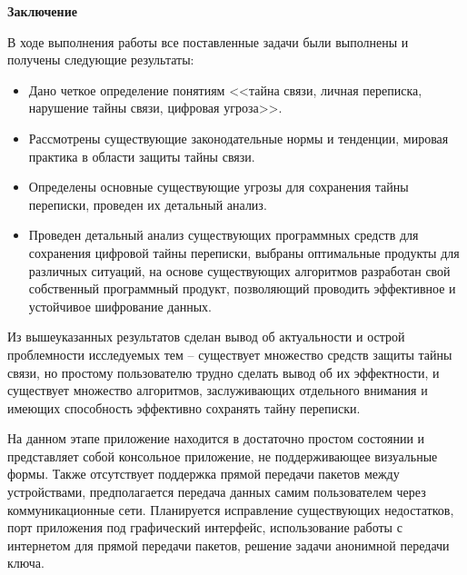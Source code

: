 \parindent=1cm %
\begin{center}
	
	\textbf{Заключение}
	
\end{center}

В ходе выполнения работы все поставленные задачи были выполнены и получены следующие результаты: 
\begin{itemize}
	\item  Дано четкое определение понятиям <<тайна связи, личная переписка, нарушение тайны связи, цифровая угроза>>.
	\item Рассмотрены существующие законодательные нормы и тенденции, мировая практика в области защиты тайны связи.
	\item Определены основные существующие угрозы для сохранения тайны переписки, проведен их детальный анализ.
	\item Проведен детальный анализ существующих программных средств для сохранения цифровой тайны переписки, выбраны оптимальные продукты для различных ситуаций, на основе существующих алгоритмов разработан свой собственный программный продукт, позволяющий проводить эффективное и устойчивое шифрование данных. 
\end{itemize}

Из  вышеуказанных результатов  сделан вывод об актуальности и острой проблемности исследуемых тем -- существует множество средств защиты тайны связи, но простому пользователю трудно сделать вывод об их эффектности, и существует множество алгоритмов, заслуживающих отдельного внимания и имеющих способность эффективно сохранять тайну переписки.

На данном этапе приложение находится в достаточно простом состоянии и представляет собой консольное приложение, не поддерживающее визуальные формы. Также отсутствует поддержка прямой передачи пакетов между устройствами, предполагается передача данных самим пользователем через коммуникационные сети. Планируется исправление существующих недостатков, порт приложения под графический интерфейс, использование работы с интернетом для прямой передачи пакетов, решение задачи анонимной передачи ключа.	
\newpage